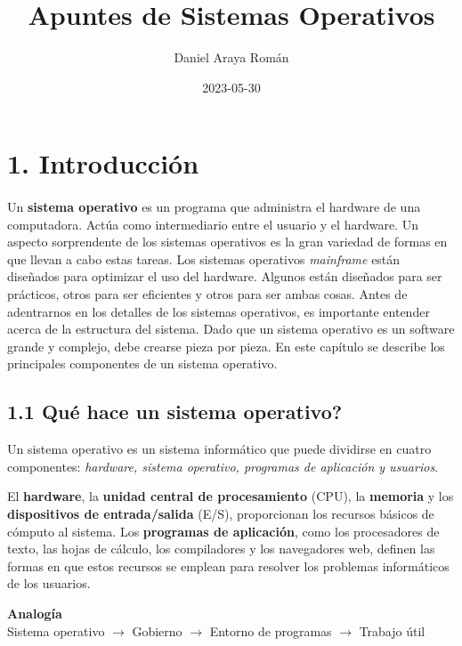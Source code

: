 \documentclass{article}
\title{Apuntes de Sistemas Operativos}
\date{2023-05-30}
\author{Daniel Araya Rom\'{a}n}
\begin{document}
\maketitle
\newpage

\section*{1. Introducci\'{o}n}
\paragraph*{}
\normalsize

Un \textbf{sistema operativo} es un programa que administra el hardware de una computadora.
Act\'{u}a como intermediario entre el usuario y el hardware. Un aspecto sorprendente de los 
sistemas operativos es la gran variedad de formas en que llevan a cabo estas tareas. Los 
sistemas operativos \textit{mainframe} est\'{a}n dise\~{n}ados para optimizar el uso del hardware.
Algunos est\'{a}n dise\~{n}ados para ser pr\'{a}cticos, otros para ser eficientes y otros para ser
ambas cosas. Antes de adentrarnos en los detalles de los sistemas operativos, es importante
entender acerca de la estructura del sistema. Dado que un sistema operativo es un software grande
y complejo, debe crearse pieza por pieza. En este cap\'{i}tulo se describe los principales componentes
de un sistema operativo.

\subsection*{1.1 Qu\'{e} hace un sistema operativo?}
Un sistema operativo es un sistema inform\'{a}tico que puede dividirse en cuatro componentes:
\textit{hardware, sistema operativo, programas de aplicaci\'{o}n y usuarios}.

El \textbf{hardware}, la \textbf{unidad central de procesamiento} (CPU), la \textbf{memoria} y los
\textbf{dispositivos de entrada/salida} (E/S), proporcionan los recursos b\'{a}sicos de c\'{o}mputo
al sistema. Los \textbf{programas de aplicaci\'{o}n}, como los procesadores de texto, las hojas de
c\'{a}lculo, los compiladores y los navegadores web, definen las formas en que estos recursos se
emplean para resolver los problemas inform\'{a}ticos de los usuarios. 

\begin{center}
    \textbf{Analog\'{i}a} \\
    Sistema operativo $\rightarrow$ Gobierno $\rightarrow$ Entorno de programas $\rightarrow$ 
    Trabajo \'{u}til 
\end{center}
\end{document}
